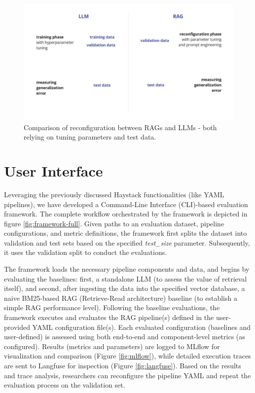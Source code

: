 \begin{figure}[h] %
    \centering
    \includegraphics[width=\textwidth]{images/RAGvsLLM-tuning.pdf}
    \caption{Comparison of reconfiguration between RAGs and LLMs - both relying on tuning parameters and test data.}
    \label{fig:tuning}
\end{figure}

\section{User Interface}

Leveraging the previously discussed Haystack functionalities (like YAML pipelines), we have developed a Command-Line Interface (CLI)-based evaluation framework. The complete workflow orchestrated by the framework is depicted in figure \ref{fig:framework-full}. Given paths to an evaluation dataset, pipeline configurations, and metric definitions, the framework first splits the dataset into validation and test sets based on the specified \textit{test\_size} parameter. Subsequently, it uses the validation split to conduct the evaluations.

The framework loads the necessary pipeline components and data, and begins by evaluating the baselines: first, a standalone LLM (to assess the value of retrieval itself), and second, after ingesting the data into the specified vector database, a naive BM25-based RAG (Retrieve-Read architecture) baseline (to establish a simple RAG performance level). Following the baseline evaluations, the framework executes and evaluates the RAG pipeline(s) defined in the user-provided YAML configuration file(s). Each evaluated configuration (baselines and user-defined) is assessed using both end-to-end and component-level metrics (as configured). Results (metrics and parameters) are logged to MLflow for visualization and comparison (Figure \ref{fig:mlflow}), while detailed execution traces are sent to Langfuse for inspection (Figure \ref{fig:langfuse}). Based on the results and trace analysis, researchers can reconfigure the pipeline YAML and repeat the evaluation process on the validation set.

